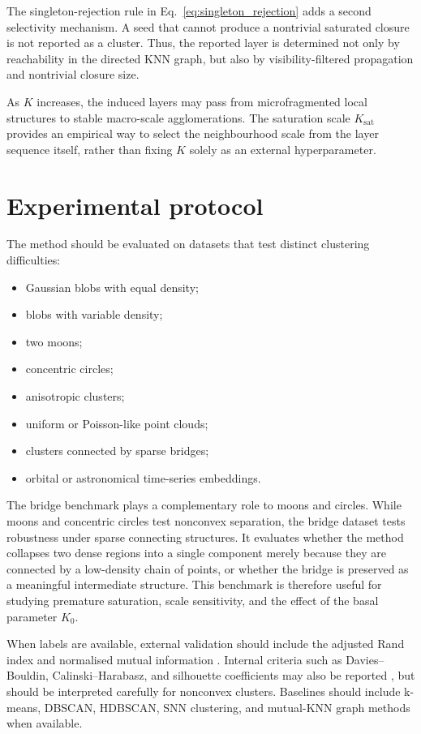 \documentclass[pdflatex,sn-mathphys-num]{sn-jnl}
\begin{document}
The singleton-rejection rule in Eq.~\eqref{eq:singleton_rejection} adds a second selectivity mechanism. A seed that cannot produce a nontrivial saturated closure is not reported as a cluster. Thus, the reported layer is determined not only by reachability in the directed KNN graph, but also by visibility-filtered propagation and nontrivial closure size.

As $K$ increases, the induced layers may pass from microfragmented local structures to stable macro-scale agglomerations. The saturation scale $K_{\mathrm{sat}}$ provides an empirical way to select the neighbourhood scale from the layer sequence itself, rather than fixing $K$ solely as an external hyperparameter.

\section{Experimental protocol}\label{sec:experimental_protocol}

The method should be evaluated on datasets that test distinct clustering difficulties:
\begin{itemize}
    \item Gaussian blobs with equal density;
    \item blobs with variable density;
    \item two moons;
    \item concentric circles;
    \item anisotropic clusters;
    \item uniform or Poisson-like point clouds;
    \item clusters connected by sparse bridges;
    \item orbital or astronomical time-series embeddings.
\end{itemize}

The bridge benchmark plays a complementary role to moons and circles. While moons and concentric circles test nonconvex separation, the bridge dataset tests robustness under sparse connecting structures. It evaluates whether the method collapses two dense regions into a single component merely because they are connected by a low-density chain of points, or whether the bridge is preserved as a meaningful intermediate structure. This benchmark is therefore useful for studying premature saturation, scale sensitivity, and the effect of the basal parameter $K_0$.

When labels are available, external validation should include the adjusted Rand index and normalised mutual information \citep{HubertArabie1985,VinhEppsBailey2010}. Internal criteria such as Davies--Bouldin, Calinski--Harabasz, and silhouette coefficients may also be reported \citep{DaviesBouldin1979,CalinskiHarabasz1974,Rousseeuw1987}, but should be interpreted carefully for nonconvex clusters. Baselines should include k-means, DBSCAN, HDBSCAN, SNN clustering, and mutual-KNN graph methods when available.
\end{document}
